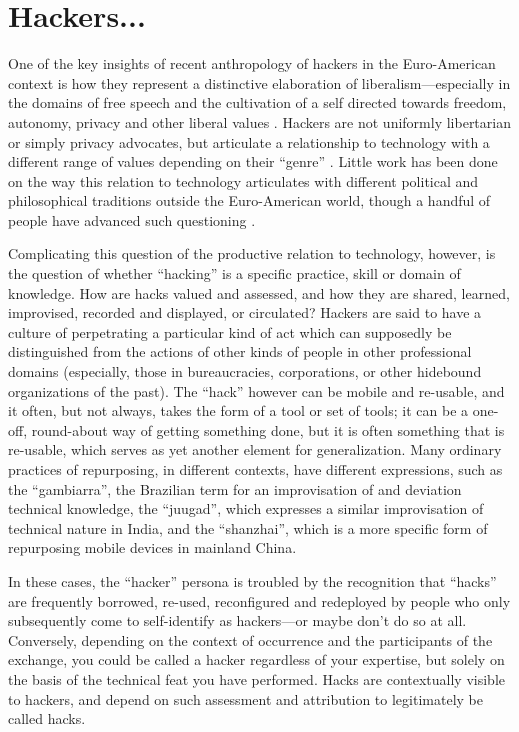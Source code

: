 \documentclass[10pt,letter,oneside]{scrartcl}
\begin{document}
\section*{Hackers...}

One of the key insights of recent anthropology of hackers in the Euro-American
context is how they represent a distinctive elaboration of
liberalism---especially in the domains of free speech and the cultivation of a
self directed towards freedom, autonomy, privacy and other liberal
values \autocite{coleman_coding_2012,kelty_two_2008,coleman_hacker_2014}. Hackers
are not uniformly libertarian or simply privacy advocates, but articulate a
relationship to technology with a different range of values depending on their
``genre'' \autocite{coleman_hacker_2008}. Little work has been done on the way
this relation to technology articulates with different political and
philosophical traditions outside the Euro-American world, though a handful of
people have advanced such questioning
\autocite{xiang_2007,takhteyev_coding_2012,chan_networking_2013,murillo2015}.

Complicating this question of the productive relation to technology, however, is
the question of whether ``hacking'' is a specific practice, skill or domain of
knowledge.  How are hacks valued and assessed, and how they are shared, learned,
improvised, recorded and displayed, or circulated?  Hackers are said to have a
culture of perpetrating a particular kind of act which can supposedly be
distinguished from the actions of other kinds of people in other professional
domains (especially, those in bureaucracies, corporations, or other hidebound
organizations of the past).  The ``hack'' however can be mobile and re-usable, and
it often, but not always, takes the form of a tool or set of tools; it can be a
one-off, round-about way of getting something done, but it is often something
that is re-usable, which serves as yet another element for generalization.  Many
ordinary practices of repurposing, in different contexts, have different
expressions, such as the ``gambiarra'', the Brazilian term for an improvisation
of and deviation technical knowledge, the ``juugad'', which expresses a similar
improvisation of technical nature in India, and the ``shanzhai'', which is a
more specific form of repurposing mobile devices in mainland China.


In these cases, the ``hacker'' persona is troubled by the recognition that
``hacks'' are frequently borrowed, re-used, reconfigured and redeployed by
people who only subsequently come to self-identify as hackers---or maybe
don’t do so at all.  Conversely, depending on the context of occurrence and the
participants of the exchange, you could be called a hacker regardless of your
expertise, but solely on the basis of the technical feat you have performed.
Hacks are contextually visible to hackers, and depend on such assessment and
attribution to legitimately be called hacks.
\end{document}
